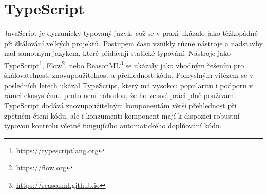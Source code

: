 





\section{TypeScript}

JavaScript je dynamicky typovaný jazyk, což se v praxi ukázalo jako těžkopádné při škálování velkých projektů.
Postupem času vznikly různé nástroje a nadstavby nad samotným jazykem, které přidávají statické typování.
Nástroje jako TypeScript\footnote{\url{https://typescriptlang.org}}, Flow\footnote{\url{https://flow.org}}, nebo ReasonML\footnote{\url{https://reasonml.github.io}} se ukázaly jako vhodným řešením pro škálovatelnost, znovupoužitelnost a přehlednost kódu.
Pomyslným vítězem se v posledních letech ukázal TypeScript, který má vysokou popularitu i podporu v rámci ekosystému, proto není náhodou, že ho ve své práci plně používám.
TypeScript dodává znovupoužitelným komponentám větší přehlednost při zpětném čtení kódu, ale i konzumenti komponent mají k dispozici robustní typovou kontrolu včetně fungujícího automatického doplňování kódu.

